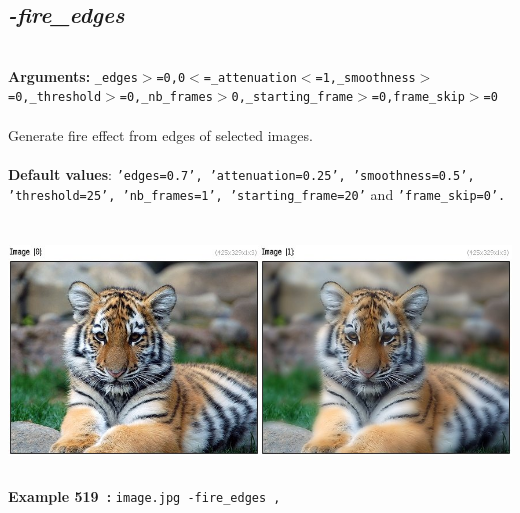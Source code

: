 \documentclass[a4paper,11pt,twoside]{book}
\begin{document}
\subsection{\emph{-fire\_edges} }\vspace*{-0.5em}
~\\\textbf{Arguments: } 
{\small \texttt{\_edges$>$=0,0$<$=\_attenuation$<$=1,\_smoothness$>$=0,\_threshold$>$=0,\_nb\_frames$>$0,\_starting\_frame$>$=0,frame\_skip$>$=0}}\\~\\
Generate fire effect from edges of selected images.
~\\~\\\textbf{Default values}: {\small \texttt{'edges=0.7', 'attenuation=0.25', 'smoothness=0.5', 'threshold=25', 'nb\_frames=1', 'starting\_frame=20'} and \texttt{'frame\_skip=0'.}}
\begin{center}\includegraphics[keepaspectratio=true,height=7cm,width=\textwidth]{img/gmic_def519.jpg}\\
{\footnotesize \textbf{Example 519~:} \texttt{image.jpg -fire\_edges ,}}
\end{center}
\end{document}
